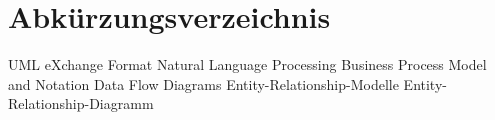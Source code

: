 \chapter*{Abkürzungsverzeichnis}
\begin{acronym}[Bash]
     {UML eXchange Format}
     {Natural Language Processing}
     {Business Process Model and Notation}
     {Data Flow Diagrams}
     {Entity-Relationship-Modelle}
     {Entity-Relationship-Diagramm}
\end{acronym}